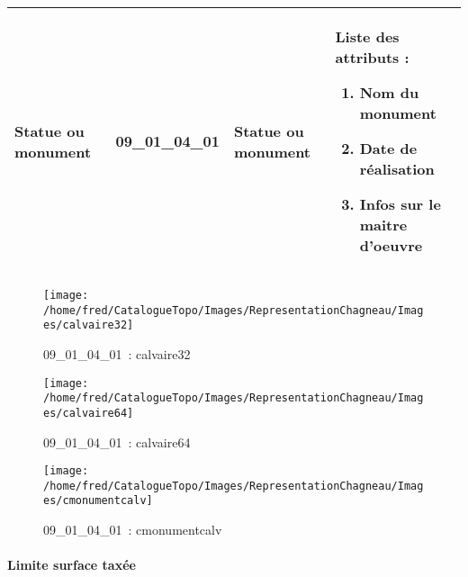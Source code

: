 \documentclass[12pt,titlepage]{book}
\begin{document}
\renewcommand{\arraystretch}{1.2}
\begin{supertabular}{|p{10cm}|c|p{13cm}|p{12cm}|}
 Statue ou monument & 09\_01\_04\_01 & Statue ou monument & Liste des attributs :
\begin{enumerate}
  \item Nom du monument  \item Date de réalisation  \item Infos sur le maitre d'oeuvre\end{enumerate}
\\
\hline
\end{supertabular}
\begin{figure}[h!]
  \hfill         %
  \begin{minipage}[t]{3cm}
    \begin{center}
      \texttt{[image: /home/fred/CatalogueTopo/Images/RepresentationChagneau/Images/calvaire32]}
      \caption[~09\_01\_04\_01]{\small{09\_01\_04\_01~:} \tiny{calvaire32}}\label{calvaire32}
    \end{center}
  \end{minipage}
  \begin{minipage}[t]{3cm}
    \begin{center}
      \texttt{[image: /home/fred/CatalogueTopo/Images/RepresentationChagneau/Images/calvaire64]}
      \caption[~09\_01\_04\_01]{\small{09\_01\_04\_01~:} \tiny{calvaire64}}\label{calvaire64}
    \end{center}
  \end{minipage}
  \begin{minipage}[t]{3cm}
    \begin{center}
      \texttt{[image: /home/fred/CatalogueTopo/Images/RepresentationChagneau/Images/cmonumentcalv]}
      \caption[~09\_01\_04\_01]{\small{09\_01\_04\_01~:} \tiny{cmonumentcalv}}\label{cmonumentcalv}
    \end{center}
  \end{minipage}
\end{figure}


\paragraph{Limite surface taxée}
\noindent
\vspace{\baselineskip}
\end{document}
